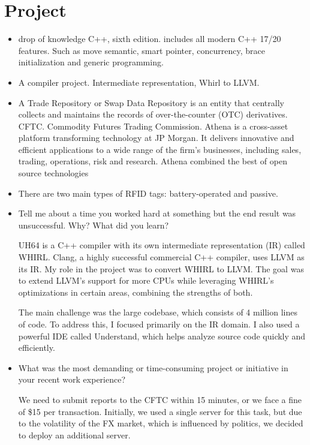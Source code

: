\documentclass[a4paper,11pt,twoside]{book}
\begin{document}
\section{Project}
\begin{itemize}
	\item drop of knowledge C++, sixth edition. includes all modern C++ 17/20 features. Such as move semantic,  smart pointer, concurrency, brace initialization and generic programming. 
	
	\item A compiler project. Intermediate representation, Whirl to LLVM. 
	
	\item A Trade Repository or Swap Data Repository is an entity that centrally collects and maintains the records of over-the-counter (OTC) derivatives. CFTC. Commodity Futures Trading Commission.   Athena is a cross-asset platform transforming technology at JP Morgan. It delivers innovative and efficient applications to a wide range of the firm's businesses, including sales, trading, operations, risk and research. Athena combined the best of open source technologies
	
	\item There are two main types of RFID tags: battery-operated and passive. 
	
	
	\item Tell me about a time you worked hard at something but the end result was unsuccessful. Why? What did
	you learn?
	
	UH64 is a C++ compiler with its own intermediate representation (IR) called WHIRL. Clang, a highly successful commercial C++ compiler, uses LLVM as its IR. My role in the project was to convert WHIRL to LLVM. The goal was to extend LLVM’s support for more CPUs while leveraging WHIRL’s optimizations in certain areas, combining the strengths of both.
	
	The main challenge was the large codebase, which consists of 4 million lines of code. To address this, I focused primarily on the IR domain. I also used a powerful IDE called Understand, which helps analyze source code quickly and efficiently.
	
	\item What was the most demanding or time-consuming project or initiative in your recent work experience?
	
	We need to submit reports to the CFTC within 15 minutes, or we face a fine of \$15 per transaction. Initially, we used a single server for this task, but due to the volatility of the FX market, which is influenced by politics, we decided to deploy an additional server.
	

\end{itemize}
\end{document}
